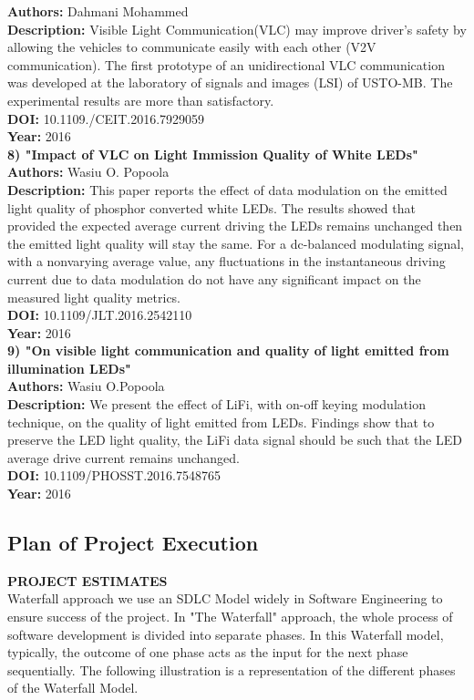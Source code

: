 \documentclass[12pt,a4paper]
{article}
\numberwithin{table}{section}
\begin{document}
{{\textbf{Authors: }Dahmani Mohammed\\
\textbf{Description: }Visible Light Communication(VLC) may improve driver's safety by allowing the vehicles to communicate easily with each other (V2V communication). The first prototype of an unidirectional VLC communication was developed at the laboratory of signals and images (LSI) of USTO-MB. The experimental results are more than satisfactory.\\
\textbf{DOI: }10.1109./CEIT.2016.7929059\\
\textbf{Year: }2016\\
\newline \textbf{8) "Impact of VLC on Light Immission Quality of White LEDs"}\\
\textbf{Authors: }Wasiu O. Popoola\\
\textbf{Description: }This paper reports the effect of data modulation on the emitted light quality of phosphor converted white LEDs. The results showed that provided the expected average current driving the LEDs remains unchanged then the emitted light quality will stay the same. For a dc-balanced modulating signal, with a nonvarying average value, any fluctuations in the instantaneous driving current due to data modulation do not have any significant impact on the measured light quality metrics. \\
\textbf{DOI: }10.1109/JLT.2016.2542110\\
\textbf{Year: }2016\\
\newline \textbf{9) "On visible light communication and quality of light emitted from illumination LEDs"}\\
\textbf{Authors: }Wasiu O.Popoola\\
\textbf{Description: }We present the effect of LiFi, with on-off keying modulation technique, on the quality of light emitted from LEDs. Findings show that to preserve the LED light quality, the LiFi data signal should be such that the LED average drive current remains unchanged.\\
\textbf{DOI: }10.1109/PHOSST.2016.7548765\\
\textbf{Year: }2016\\
  
  
  \newpage
  
  \subsection{Plan of Project Execution}
\textbf{PROJECT ESTIMATES} \\ 
Waterfall approach we use an SDLC Model widely in Software Engineering to ensure success of the project. In "The Waterfall" approach, the whole process of software development is divided into separate phases. In this Waterfall model, typically, the outcome of one phase acts as the input for the next phase sequentially. The following illustration is a representation of the different phases of the Waterfall Model.

}}
\end{document}
